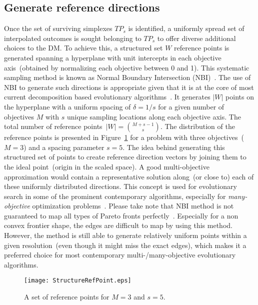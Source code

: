 \subsection{Generate reference directions} Once the set of surviving {\color{blue}simplexes} $TP_s$ is identified, a uniformly spread set of interpolated outcomes is sought belonging to $TP_s$ to offer diverse additional choices to the DM. To achieve this, a structured set $W$ reference points is generated spanning a hyperplane with unit intercepts in each objective axis~(obtained by normalizing each objective between 0 and 1). This systematic sampling method is known as Normal Boundary Intersection (NBI)~\cite{DASAugust1998}. The use of NBI to generate such directions is appropriate given that it is at the core of most current decomposition based evolutionary algorithms~\cite{Asafmany2015}. It generates $|W|$ points on the hyperplane with a uniform spacing of $\delta=1/s$ for a given number of objectives $M$ with $s$ unique sampling locations along each objective axis. The total number of reference points~$|W| = {M+s-1\choose s}$. The distribution of the reference points is presented in Figure~\ref{fig:Refpoint} for a problem with three objectives~($M=3$) and a spacing parameter $s=5$. The idea behind generating this structured set of points to create reference direction vectors by joining them to the ideal point~(origin in the scaled space). A good multi-objective approximation would contain a representative solution along~(or close to) each of these uniformly distributed directions. This concept is used for evolutionary search in some of the prominent contemporary algorithms, especially for \emph{many-objective} optimization problems~\cite{Asafmany2015}. {\color{blue}Please take note that NBI method is not guaranteed to map all types of Pareto fronts perfectly~\cite{DASAugust1998}. Especially for a non convex frontier shape, the edges are difficult to map by using this method. However, the method is still able to generate relatively uniform points within a given resolution~(even though it might miss the exact edges), which makes it a preferred choice for most contemporary multi-/many-objective evolutionary algorithms.}


\begin{figure}[!ht]
	\centering
	\texttt{[image: StructureRefPoint.eps]}
	\caption{A set of reference points for $M=3$ and $s=5$. }
	\label{fig:Refpoint}
\end{figure}




